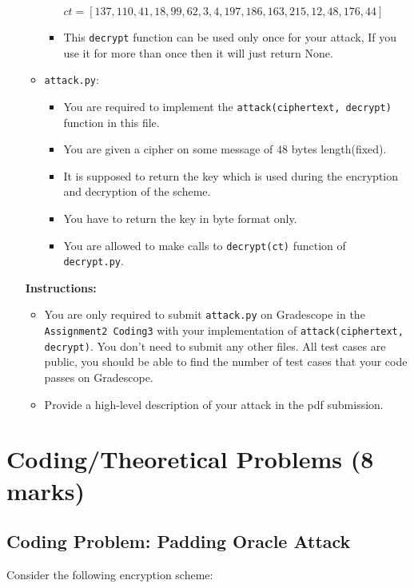 \documentclass[11pt]{article}
\begin{document}
\begin{enumerate}
\begin{itemize}
\begin{itemize}
                        $ct = [137, 110, 41, 18, 99, 62, 3, 4, 197, 186, 163, 215, 12, 48, 176, 44]$
                        \item This \texttt{decrypt} function can be used only once for your attack, If you use it for more than once then it will just return None.
                    \end{itemize}
                \item \texttt{attack.py}:
                    \begin{itemize}
                        \item You are required to implement the \texttt{attack(ciphertext, decrypt)} function in this file.
                        \item You are given a cipher on some message of $48$ bytes length(fixed).
                        \item It is supposed to return the key which is used during the encryption and decryption of the scheme.
                        \item You have to return the key in byte format only.
                        \item You are allowed to make calls to \texttt{decrypt(ct)} function of \texttt{decrypt.py}.                
                    \end{itemize}
            \end{itemize}
        
        
        \textbf{Instructions:}
        \begin{itemize}
            \item You are only required to submit \texttt{attack.py} on Gradescope in the \texttt{Assignment2 Coding3} with your implementation of \texttt{attack(ciphertext, decrypt)}. You don’t need to submit any other files. All test cases are public, you should be able to find the number of test cases that your code passes on Gradescope.
            \item Provide a high-level description of your attack in the pdf submission.
        \end{itemize}
    
        \newpage 
    \end{enumerate}

    \section{Coding/Theoretical Problems (8 marks) }
        \subsection{Coding Problem: Padding Oracle Attack}
        \label{sec:coding}
            Consider the following encryption scheme:
\end{document}
